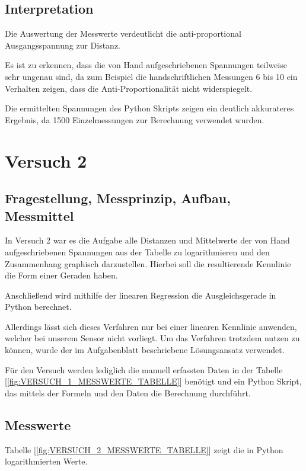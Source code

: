 \documentclass[12pt, oneside, a4paper, \docLanguage]{report}
\begin{document}
\section{Interpretation}
\label{chap:VERSUCH_1_INTERPRETATION}
Die Auswertung der Messwerte verdeutlicht die anti-proportional Ausgangsspannung zur Distanz.

Es ist zu erkennen, dass die von Hand aufgeschriebenen Spannungen teilweise sehr ungenau sind, da zum Beispiel die handschriftlichen Messungen 6 bis 10 ein Verhalten zeigen, dass die Anti-Proportionalität nicht widerspiegelt.

Die ermittelten Spannungen des Python Skripts zeigen ein deutlich akkurateres Ergebnis, da 1500 Einzelmessungen zur Berechnung verwendet wurden.
%
%
\chapter{Versuch 2}
\label{chap:VERSUCH_2}

\section{Fragestellung, Messprinzip, Aufbau, Messmittel}
\label{chap:VERSUCH_2_FRAGESTELLUNG}
In Versuch 2 war es die Aufgabe alle Distanzen und Mittelwerte der von Hand aufgeschriebenen Spannungen aus der Tabelle zu logarithmieren und den Zusammenhang graphisch darzustellen. Hierbei soll die resultierende Kennlinie die Form einer Geraden haben. 

Anschließend wird mithilfe der linearen Regression die Ausgleichsgerade in Python berechnet. 

Allerdings lässt sich dieses Verfahren nur bei einer linearen Kennlinie anwenden, welcher bei unserem Sensor nicht vorliegt. Um das Verfahren trotzdem nutzen zu können, wurde der im Aufgabenblatt beschriebene Lösungsansatz verwendet.

Für den Versuch werden lediglich die manuell erfassten Daten in der Tabelle [\ref{fig:VERSUCH_1_MESSWERTE_TABELLE}] benötigt und ein Python Skript, das mittels der Formeln und den Daten die Berechnung durchführt.
\newpage
\section{Messwerte}
\label{chap:VERSUCH_2_MESSWERTE}
Tabelle  [\ref{fig:VERSUCH_2_MESSWERTE_TABELLE}]  zeigt die in Python logarithmierten Werte.
\end{document}
